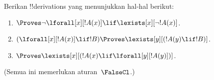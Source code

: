 \documentclass[../../../include/open-logic-section]{subfiles}
\begin{document}
\begin{prob}
Berikan !!{derivation}s yang menunjukkan hal-hal berikut:
\begin{enumerate}
\item $\Proves \lnot\lforall[x][!A(x)] \lif \lexists[x][\lnot!A(x)]$.
\item $(\lforall[x][!A(x)] \lif !B) \Proves \lexists[y][(!A(y) \lif !B)]$.
\item $\Proves \lexists[x][(!A(x) \lif \lforall[y][!A(y)])]$.
\end{enumerate}
(Semua ini memerlukan aturan~$\FalseCl$.)
\end{prob}
\end{document}
